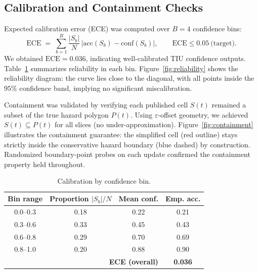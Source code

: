 \documentclass[journal]{new-aiaa}
\begin{document}
\subsection{Calibration and Containment Checks}
Expected calibration error (ECE) was computed over $B=4$ confidence bins:
\begin{equation}
    \mathrm{ECE} \;=\; \sum_{b=1}^{B} \frac{|S_b|}{N}\,\bigl| \mathrm{acc}(S_b)-\mathrm{conf}(S_b) \bigr|,\qquad \mathrm{ECE}\le 0.05~\text{(target)}.
\end{equation}
We obtained $\mathrm{ECE}=0.036$, indicating well-calibrated TIU confidence outputs. Table~\ref{tab:ece_bins} summarizes reliability in each bin. Figure~\ref{fig:reliability} shows the reliability diagram: the curve lies close to the diagonal, with all points inside the $95\%$ confidence band, implying no significant miscalibration.

Containment was validated by verifying each published cell $S(t)$ remained a subset of the true hazard polygon $P(t)$. Using $\varepsilon$-offset geometry, we achieved $S(t)\subseteq P(t)$ for all slices (no under-approximation). Figure~\ref{fig:containment} illustrates the containment guarantee: the simplified cell (red outline) stays strictly inside the conservative hazard boundary (blue dashed) by construction. Randomized boundary-point probes on each update confirmed the containment property held throughout.

\begin{table}[h!]
\centering
\caption{Calibration by confidence bin.}
\label{tab:ece_bins}
\begin{tabular}{@{}cccc@{}}
\toprule
Bin range & Proportion $|S_b|/N$ & Mean conf. & Emp. acc. \\
\midrule
0.0--0.3 & 0.18 & 0.22 & 0.21 \\
0.3--0.6 & 0.33 & 0.45 & 0.43 \\
0.6--0.8 & 0.29 & 0.70 & 0.69 \\
0.8--1.0 & 0.20 & 0.88 & 0.90 \\
\midrule
\multicolumn{3}{r}{\textbf{ECE (overall)}} & \textbf{0.036} \\
\bottomrule
\end{tabular}
\end{table}
\end{document}
